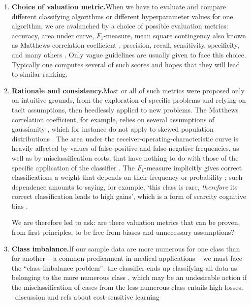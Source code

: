 \documentclass[\ifafour a4paper,12pt,\else a5paper,10pt,\fi%
onecolumn,oneside,article,%
british%
]{memoir}
\theoremstyle{remark}
\theoremstyle{innote}
\renewcommand*{\|}[1][]{\nonscript\:#1\vert\nonscript\:\mathopen{}}
\newcommand*{\sect}{\S}%
\newcommand*{\wrench}{{\fontencoding{U}\fontfamily{fontawesomethree}\selectfont\symbol{114}}}
\newcommand{\mynotew}[1]{{\footnotesize\color{notecolour}\wrench\ #1}}
\begin{document}
\begin{enumerate}[label=\textbf{\textsf{i\arabic*}},ref=\textbf{\textsf{i\arabic*}},itemsep=\parsep]
  
\item\label{item:metrics}\textsf{\textbf{Choice of valuation metric.}}\enspace When we have to evaluate and compare different classifying algorithms or different hyperparameter values for one algorithm, we are avalanched by a choice of possible evaluation metrics: accuracy, area under curve, $F_{1}$-measure, mean square contingency \autocites[denoted \enquote{$r$} there]{yule1912} also known as Matthews correlation coefficient \autocites{matthews1975}[\sect~31 p.~183]{fisher1925_r1963}, precision, recall, sensitivity, specificity, and many others \autocites{sammutetal2011_r2017}[see also the analysis in ][]{goodmanetal1954,goodmanetal1959,goodmanetal1963,goodmanetal1972b}. Only vague guidelines are usually given to face this choice. Typically one computes several of such scores and hopes that they will lead to similar ranking.

\item\label{item:rationale}\textsf{\textbf{Rationale and consistency.}}\enspace Most or all of such metrics were proposed only on intuitive grounds, from the exploration of specific problems and relying on tacit assumptions, then heedlessly applied to new problems. The Matthews correlation coefficient, for example, relies on several assumptions of gaussianity \autocites[\sect~31 p.~183 first paragraph]{fisher1925_r1963}, which for instance do not apply to skewed population distributions \autocites{jenietal2013,zhu2020}. The area under the receiver-operating-characteristic curve is heavily affected by values of false-positive and false-negative frequencies, as well as by misclassification costs, that have nothing to do with those of the specific application of the classifier \autocites{bakeretal2001,loboetal2008}. The $F_{1}$-measure implicitly gives correct classifications a weight that depends on their frequency or probability \autocites{handetal2018}; such dependence amounts to saying, for example, \enquote*{this class is rare, \emph{therefore} its correct classification leads to high gains}, which is a form of scarcity cognitive bias \autocites{camereretal1989,kimetal1999,mittoneetal2009}.

  We are therefore led to ask: are there valuation metrics that can be proven, from first principles, to be free from biases and unnecessary assumptions?

\item\label{item:class_imbal}\textsf{\textbf{Class imbalance.}}\enspace  If our sample data are more numerous for one class than for another -- a common predicament in medical applications -- we must face the \enquote{class-imbalance problem}: the classifier ends up classifying all data as belonging to the more numerous class \autocites{sammutetal2011_r2017,provost2000}, which may be an undesirable action if the misclassification of cases from the less numerous class entails high losses. \mynotew{discussion and refs about cost-sensitive learning}
  

\end{enumerate}
\end{document}
